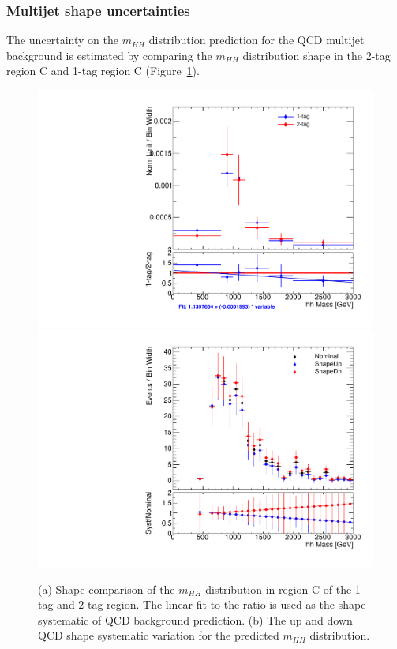 %
%
\subsubsection{Multijet shape uncertainties}
\label{sec:boosted_bkgd_qcdmultijet_shape_unc}
 
The uncertainty on the $m_{HH}$ distribution prediction for the QCD multijet background is estimated by comparing
the $m_{HH}$ distribution shape in the 2-tag region C and 1-tag region C (Figure~\ref{fig:boosted_abcd_shapesyst}).
 
\begin{figure}[!h]
\begin{center}
\includegraphics[scale=0.33]{./figures/boosted/ABCD/QCD_SR_hhMass.pdf}
\includegraphics[scale=0.33]{./figures/boosted/ABCD/Fit_QCD_SR_hhMass.pdf}
\caption{(a) Shape comparison of the $m_{HH}$ distribution in region C of the 1-tag and 2-tag region.
The linear fit to the ratio is used as the shape systematic of QCD background prediction.
(b) The up and down QCD shape systematic variation for the predicted $m_{HH}$ distribution.}
\label{fig:boosted_abcd_shapesyst}
\end{center}
\end{figure}

